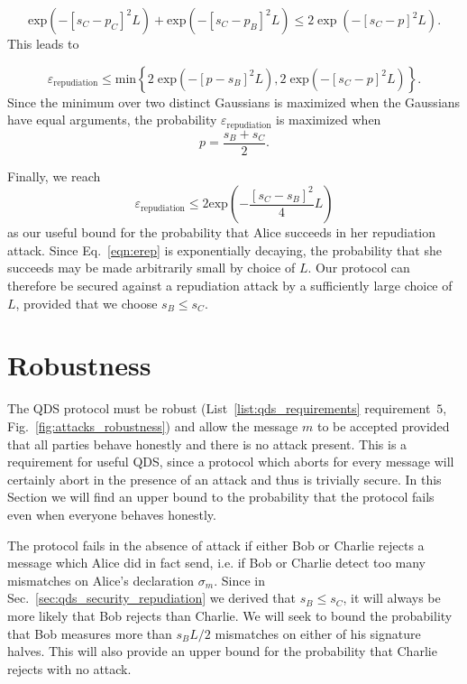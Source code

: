 \begin{equation}
\text{exp}\left(- \left[s_C - p_C\right]^2 L \right) + \text{exp}\left(- \left[s_C - p_B\right]^2 L \right) \le 2 \exp\left( - \left[s_C - p\right]^2 L\right).
\end{equation}
This leads to

\begin{equation}
\varepsilon_{\text{repudiation}} \le \text{min}\left\{ 2 \; \text{exp}\left( - \left[p - s_B\right]^2 L \right), 2 \; \text{exp}\left( - \left[s_C - p\right]^2 L \right) \right\}.
\end{equation}
Since the minimum over two distinct Gaussians is maximized when the Gaussians have equal arguments, the probability $\varepsilon_{\text{repudiation}}$ is maximized when 
\begin{equation}
p = \frac{s_B + s_C}{2}.
\end{equation}

\noindent Finally, we reach
\begin{equation}\label{eqn:erep}
\varepsilon_{\text{repudiation}} \le 2 \text{exp}\left( - \frac{\left[s_C - s_B\right]^2}{4} L\right)
\end{equation}
as our useful bound for the probability that Alice succeeds in her repudiation attack. Since Eq.~\ref{eqn:erep} is exponentially decaying, the probability that she succeeds may be made arbitrarily small by choice of $L$. Our protocol can therefore be secured against a repudiation attack by a sufficiently large choice of $L$, provided that we choose $s_B \le s_C$.




\section{Robustness}\label{sec:qds_security_robustness}
The QDS protocol must be robust (List~\ref{list:qds_requirements} requirement~$5$, Fig.~\ref{fig:attacks_robustness}) and allow the message $m$ to be accepted provided that all parties behave honestly and there is no attack present. This is a requirement for useful QDS, since a protocol which aborts for every message will certainly abort in the presence of an attack and thus is trivially secure. In this Section we will find an upper bound to the probability that the protocol fails even when everyone behaves honestly.

The protocol fails in the absence of attack if either Bob or Charlie rejects a message which Alice did in fact send, i.e. if Bob or Charlie detect too many mismatches on Alice's declaration $\sigma_m$. Since in Sec.~\ref{sec:qds_security_repudiation} we derived that $s_B \le s_C$, it will always be more likely that Bob rejects than Charlie. We will seek to bound the probability that Bob measures more than $s_B L/2$ mismatches on either of his signature halves. This will also provide an upper bound for the probability that Charlie rejects with no attack.

